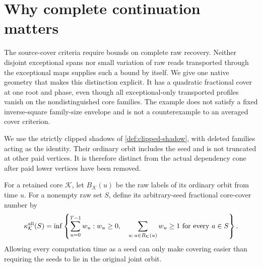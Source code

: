 \section{Why complete continuation matters}
\label{sec:limitations}

The source-cover criteria require bounds on complete raw recovery.
Neither disjoint exceptional spans nor small variation of raw reads
transported through the exceptional maps supplies such a bound by itself.
We give one native geometry that makes this distinction explicit.  It
has a quadratic fractional cover at one root and phase, even though all
exceptional-only transported profiles vanish on the nondistinguished
core families.  The example does not satisfy a fixed inverse-square
family-size envelope and is not a counterexample to an averaged cover
criterion.

We use the strictly clipped shadows of \cref{def:clipped-shadow}, with
deleted families acting as the identity. Their ordinary orbit includes
the seed and is not truncated at other paid vertices. It is therefore
distinct from the actual dependency cone after paid lower vertices have
been removed.

For a retained core $\mathcal K$, let $B_{\mathcal K}(u)$ be the raw
labels of its ordinary orbit from time $u$.  For a nonempty raw set $S$,
define its arbitrary-seed fractional core-cover number by
\begin{equation}
 \kappa_{\mathcal K}^{\rm all}(S)
 =\inf\left\{\sum_{u=0}^{T-1}w_u:
 w_u\ge0,\quad
 \sum_{u:\,a\in B_{\mathcal K}(u)}w_u\ge1
       \text{ for every }a\in S\right\}.
 \label{eq:arbitrary-seed-cover}
\end{equation}
Allowing every computation time as a seed can only make covering easier
than requiring the seeds to lie in the original joint orbit.

